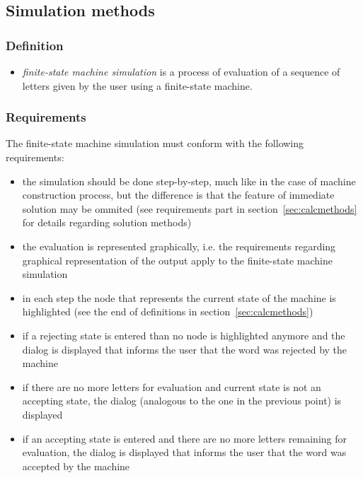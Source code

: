\documentclass{article}
\begin{document}
\subsection{Simulation methods}

\subsubsection*{Definition}
\begin{itemize}[noitemsep,nolistsep]

  \item \textit{finite-state machine simulation} is a process of evaluation of a sequence
  of letters given by the user using a finite-state machine.

\end{itemize}

\subsubsection*{Requirements}
The finite-state machine simulation must conform with the following requirements:
\begin{itemize}

  \item the simulation should be done step-by-step, much like in the case of machine construction
  process, but the difference is that the feature of immediate solution may be ommited
  (see requirements part in section~\ref{sec:calcmethods} for details regarding solution methods)
  
  \item the evaluation is represented graphically, i.e. the requirements regarding graphical
  representation of the output apply to the finite-state machine simulation

  \item in each step the node that represents the current state of the machine is highlighted (see
  the end of definitions in section~\ref{sec:calcmethods})
  
  \item if a rejecting state is entered than no node is highlighted anymore and the dialog is
  displayed that informs the user that the word was rejected by the machine
  
  \item if there are no more letters for evaluation and current state is not an accepting state, the
  dialog (analogous to the one in the previous point) is displayed
  
  \item if an accepting state is entered and there are no more letters remaining for evaluation, the
  dialog is displayed that informs the user that the word was accepted by the machine

\end{itemize}
\end{document}
